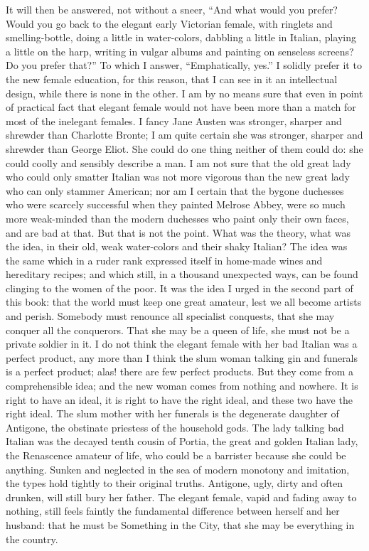 \documentclass{book}
\begin{document}
It will then be answered, not without a sneer, “And what would you prefer? Would you go back to the elegant early Victorian female, with ringlets and smelling-bottle, doing a little in water-colors, dabbling a little in Italian, playing a little on the harp, writing in vulgar albums and painting on senseless screens? Do you prefer that?” To which I answer, “Emphatically, yes.” I solidly prefer it to the new female education, for this reason, that I can see in it an intellectual design, while there is none in the other. I am by no means sure that even in point of practical fact that elegant female would not have been more than a match for most of the inelegant females. I fancy Jane Austen was stronger, sharper and shrewder than Charlotte Bronte; I am quite certain she was stronger, sharper and shrewder than George Eliot. She could do one thing neither of them could do: she could coolly and sensibly describe a man. I am not sure that the old great lady who could only smatter Italian was not more vigorous than the new great lady who can only stammer American; nor am I certain that the bygone duchesses who were scarcely successful when they painted Melrose Abbey, were so much more weak-minded than the modern duchesses who paint only their own faces, and are bad at that. But that is not the point. What was the theory, what was the idea, in their old, weak water-colors and their shaky Italian? The idea was the same which in a ruder rank expressed itself in home-made wines and hereditary recipes; and which still, in a thousand unexpected ways, can be found clinging to the women of the poor. It was the idea I urged in the second part of this book: that the world must keep one great amateur, lest we all become artists and perish. Somebody must renounce all specialist conquests, that she may conquer all the conquerors. That she may be a queen of life, she must not be a private soldier in it. I do not think the elegant female with her bad Italian was a perfect product, any more than I think the slum woman talking gin and funerals is a perfect product; alas! there are few perfect products. But they come from a comprehensible idea; and the new woman comes from nothing and nowhere. It is right to have an ideal, it is right to have the right ideal, and these two have the right ideal. The slum mother with her funerals is the degenerate daughter of Antigone, the obstinate priestess of the household gods. The lady talking bad Italian was the decayed tenth cousin of Portia, the great and golden Italian lady, the Renascence amateur of life, who could be a barrister because she could be anything. Sunken and neglected in the sea of modern monotony and imitation, the types hold tightly to their original truths. Antigone, ugly, dirty and often drunken, will still bury her father. The elegant female, vapid and fading away to nothing, still feels faintly the fundamental difference between herself and her husband: that he must be Something in the City, that she may be everything in the country.
\end{document}
